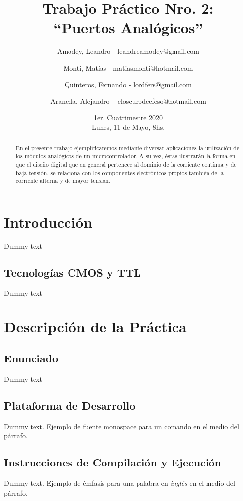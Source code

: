 \documentclass{article}
\title{Trabajo Práctico Nro. 2:\\“Puertos Analógicos”}
\author{Amodey, Leandro - leandroamodey@gmail.com
\and Monti, Matías - matiasmonti@hotmail.com
\and Quinteros, Fernando - lordfers@gmail.com
\and Araneda, Alejandro – eloscurodeefeso@hotmail.com}
\date{1er. Cuatrimestre 2020\\Lunes, 11 de Mayo, 8hs.}
\begin{document}

\maketitle

\begin{abstract}
En el presente trabajo ejemplificaremos mediante diversar aplicaciones 
la utilización de los módulos analógicos de un microcontrolador. A su 
vez, éstas ilustrarán la forma en que el diseño digital que en general 
pertenece al dominio de la corriente contínua y de baja tensión, se 
relaciona con los componentes electrónicos propios también de la 
corriente alterna y de mayor tensión.
\end{abstract}

\section*{Introducción}
Dummy text

\subsection*{Tecnologías CMOS y TTL}
Dummy text

\section*{Descripción de la Práctica}

\subsection*{Enunciado}
Dummy text

\subsection*{Plataforma de Desarrollo}
Dummy text. Ejemplo de fuente monospace {\ttfamily para un comando} en el medio del párrafo.

\subsection*{Instrucciones de Compilación y Ejecución}
Dummy text. Ejemplo de émfasis para una palabra en \textit{inglés} en el medio del párrafo.
\end{document}
